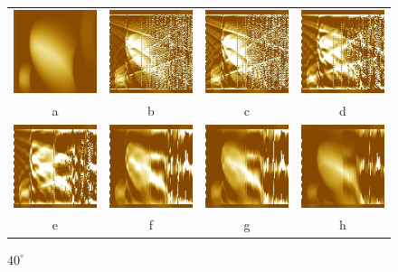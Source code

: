 \documentclass{procDDs}
\begin{document}
\begin{figure}[h!]\center%
	\begin{tabular}{cccc}
		\includegraphics[width=0.2\linewidth]{img/17/1.jpg}&
		\includegraphics[width=0.2\linewidth]{img/17/3.jpg}&
		\includegraphics[width=0.2\linewidth]{img/17/4.jpg}&
		\includegraphics[width=0.2\linewidth]{img/17/5.jpg}\\
		a & b & c & d\\
		\includegraphics[width=0.2\linewidth]{img/17/6.jpg}&
		\includegraphics[width=0.2\linewidth]{img/17/7.jpg}&
		\includegraphics[width=0.2\linewidth]{img/17/8.jpg}&
		\includegraphics[width=0.2\linewidth]{img/17/9.jpg}\\
		e & f & g & h
	\end{tabular}
	\caption{$40^\circ$}
	\label{ris:desc6}
\end{figure}
\end{document}

